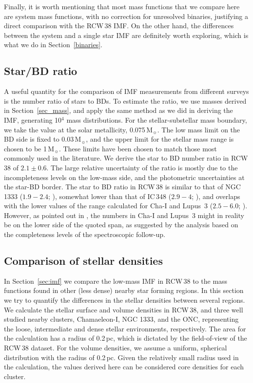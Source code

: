 \documentclass[a4paper,fleqn,usenatbib]{mnras}
\begin{document}
Finally, it is worth mentioning that most mass functions that we compare here are system mass functions, with no correction for unresolved
binaries, justifying a direct comparison with the RCW\,38 IMF. On the other hand, the differences between the system and a single star IMF
are definitely worth exploring, which is what we do in Section~\ref{binaries}.


\subsection{Star/BD ratio}

A useful quantity for the comparison of IMF measurements from different surveys
is the number ratio of stars to BDs. To estimate the ratio, we use masses 
derived in Section~\ref{sec_mass}, and apply the same method as we did in deriving the IMF, generating 10$^4$ mass distributions. 
For the stellar-substellar mass boundary, we take the value at the solar metallicity, 0.075\,M$_{\sun}$. The low mass limit on the 
BD side is fixed to 0.03\,M$_{\sun}$, and the 
upper limit for the stellar mass range is chosen to be 1\,M$_{\sun}$. These limits have been chosen to match those
most commonly used in the literature.
We derive the star to BD number ratio in RCW\,38 of $2.1 \pm 0.6$. The large relative uncertainty of the ratio is mostly 
due to the incompleteness levels on the low-mass side, and the photometric uncertainties at the star-BD border. 
The star to BD ratio in RCW\,38 is similar to that of NGC\,1333 ($1.9-2.4$; \citealt{scholz13}), somewhat lower than that of IC\,348 ($2.9 - 4$; \citealt{scholz13}),
and overlaps with the lower values of the range calculated for Cha-I and Lupus~3 ($2.5 - 6.0$; \citealt{muzic15}). However, as pointed out in \citet{muzic15}, the numbers in Cha-I and Lupus~3 
might in reality be on the lower side of the quoted span, as suggested by the analysis based on the completeness levels of the spectroscopic follow-up.

\subsection{Comparison of stellar densities}
\label{densities}
In Section~\ref{sec:imf} we compare the low-mass IMF in RCW\,38 to the mass functions found in other (less dense) nearby
star forming regions. In this section we try to quantify the differences in the stellar densities between several regions. 
We calculate the stellar surface and volume  densities in RCW\,38, and three well studied nearby clusters,
Chamaeleon-I, NGC 1333, and the ONC, representing the loose, intermediate and dense stellar environments, respectively. The area for the calculation has a radius of 0.2\,pc,
which is dictated by the field-of-view of the RCW\,38 dataset. For the volume densities, we assume a uniform, spherical distribution with the radius of 0.2\,pc.
Given the relatively small radius used in the calculation, the values
 derived here can be considered core densities for each cluster. 
\end{document}

